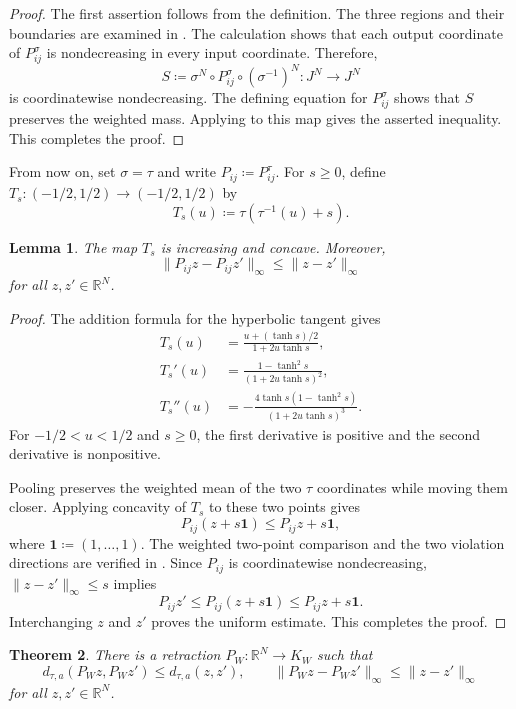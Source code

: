 \documentclass[10pt,a4paper]{amsart}
\newtheorem{theorem}{Theorem}[section]
\newtheorem{lemma}[theorem]{Lemma}
\newcommand{\R}{\mathbb R}
\begin{document}
\begin{proof}
The first assertion follows from the definition. The three regions and their boundaries are examined in . The calculation shows that each output coordinate of $P_{ij}^\sigma$ is nondecreasing in every input coordinate. Therefore,
\[
S\coloneqq\sigma^N\circ P_{ij}^\sigma\circ(\sigma^{-1})^N\colon J^N\longrightarrow J^N
\]
is coordinatewise nondecreasing. The defining equation for $P_{ij}^\sigma$ shows that $S$ preserves the weighted mass. Applying  to this map gives the asserted inequality. This completes the proof.
\end{proof}

From now on, set $\sigma=\tau$ and write $P_{ij}\coloneqq P_{ij}^\tau$. For $s\geq0$, define $T_s\colon(-1/2,1/2)\to(-1/2,1/2)$ by
\[
T_s(u)\coloneqq\tau(\tau^{-1}(u)+s).
\]

\begin{lemma}
\label{lem:tau-concavity}
The map $T_s$ is increasing and concave. Moreover,
\[
\|P_{ij}z-P_{ij}z'\|_\infty\leq\|z-z'\|_\infty
\]
for all $z,z'\in\R^N$.
\end{lemma}

\begin{proof}
The addition formula for the hyperbolic tangent gives
\[
\begin{aligned}
T_s(u)&=\frac{u+(\tanh s)/2}{1+2u\tanh s},\\
T_s'(u)&=\frac{1-\tanh^2s}{(1+2u\tanh s)^2},\\
T_s''(u)&=-\frac{4\tanh s(1-\tanh^2s)}{(1+2u\tanh s)^3}.
\end{aligned}
\]
For $-1/2<u<1/2$ and $s\geq0$, the first derivative is positive and the second derivative is nonpositive.

Pooling preserves the weighted mean of the two $\tau$ coordinates while moving them closer. Applying concavity of $T_s$ to these two points gives
\[
P_{ij}(z+s\boldsymbol1)\leq P_{ij}z+s\boldsymbol1,
\]
where $\boldsymbol1\coloneqq(1,\ldots,1)$. The weighted two-point comparison and the two violation directions are verified in . Since $P_{ij}$ is coordinatewise nondecreasing, $\|z-z'\|_\infty\leq s$ implies
\[
P_{ij}z'\leq P_{ij}(z+s\boldsymbol1)\leq P_{ij}z+s\boldsymbol1.
\]
Interchanging $z$ and $z'$ proves the uniform estimate. This completes the proof.
\end{proof}

\begin{theorem}
\label{thm:pooling-retraction}
There is a retraction $P_W\colon\R^N\to K_W$ such that
\[
d_{\tau,a}(P_Wz,P_Wz')\leq d_{\tau,a}(z,z'),\qquad\|P_Wz-P_Wz'\|_\infty\leq\|z-z'\|_\infty
\]
for all $z,z'\in\R^N$.
\end{theorem}
\end{document}
